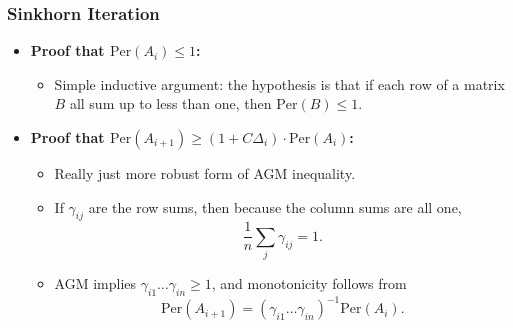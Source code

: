 \documentclass[usenames,dvipsnames,12pt]{beamer}
\begin{document}
\begin{frame}
    \frametitle{Sinkhorn Iteration}

    \begin{itemize}
        \item {\bf Proof that $\text{Per}(A_i) \leq 1$:}
        \begin{itemize}
            \pause
            \item Simple inductive argument: the hypothesis is that if each row of a matrix $B$ all sum up to less than one, then $\text{Per}(B) \leq 1$.
        \end{itemize}

        \pause
        \item {\bf Proof that $\text{Per}(A_{i+1}) \geq (1 + C \Delta_i) \cdot \text{Per}(A_i)$:}
        \begin{itemize}
            \pause
            \item Really just more robust form of AGM inequality.

            \pause
            \item If $\gamma_{ij}$ are the row sums, then because the column sums are all one,
            \[ \frac{1}{n} \sum_j \gamma_{ij} = 1. \]

            \pause
            \item AGM implies $\gamma_{i1} \dots \gamma_{in} \geq 1$, and monotonicity follows from
            \[ \text{Per}(A_{i+1}) = (\gamma_{i1} \dots \gamma_{in})^{-1} \text{Per}(A_i). \]




        \end{itemize}
    \end{itemize}
\end{frame}
\end{document}
